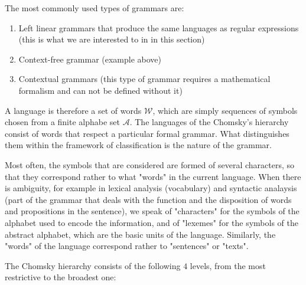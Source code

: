 	The most commonly used types of grammars are:
	\begin{enumerate}
		\item Left linear grammars that produce the same languages as regular expressions (this is what we are interested to in in this section)

		\item Context-free grammar (example above)

		\item Contextual grammars (this type of grammar requires a mathematical formalism and can not be defined without it)
	\end{enumerate}
	A language is therefore a set of words $\mathcal{W}$, which are simply sequences of symbols chosen from a finite alphabe set $\mathcal{A}$. The languages of the Chomsky's hierarchy consist of words that respect a particular formal grammar. What distinguishes them within the framework of classification is the nature of the grammar.
	\begin{tcolorbox}[title=Remark,colframe=black,arc=10pt]
	Most often, the symbols that are considered are formed of several characters, so that they correspond rather to what "words" in the current language. When there is ambiguity, for example in lexical analysis (vocabulary) and syntactic analaysis (part of the grammar that deals with the function and the disposition of words and propositions in the sentence), we speak of "characters" for the symbols of the alphabet used to encode the information, and of "lexemes" for the symbols of the abstract alphabet, which are the basic units of the language. Similarly, the "words" of the language correspond rather to "sentences" or "texts".
	\end{tcolorbox}
	The Chomsky hierarchy consists of the following $4$ levels, from the most restrictive to the broadest one:
